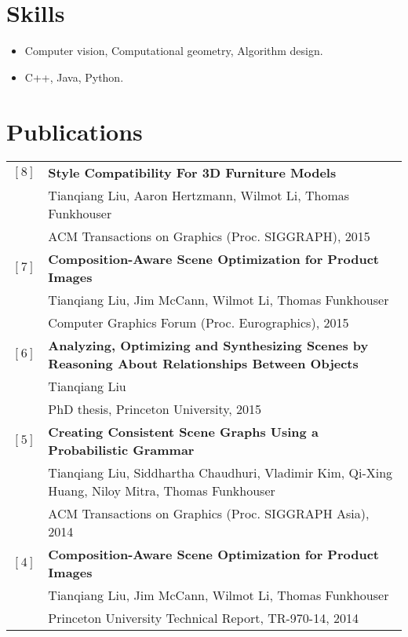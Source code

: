 \documentclass[letterpaper,10pt]{article}
\begin{document}
\section{Skills}
\begin{itemize}
    \item Computer vision, Computational geometry, Algorithm design.
    \item C++, Java, Python.
\end{itemize}

\section{Publications}
\begin{tabular}{ll}
$[8]$ & \textbf{Style Compatibility For 3D Furniture Models}\\
    & Tianqiang Liu, Aaron Hertzmann, Wilmot Li, Thomas Funkhouser \\
    & ACM Transactions on Graphics (Proc. SIGGRAPH), 2015 \vspace{0.06in}\\
$[7]$ & \textbf{Composition-Aware Scene Optimization for Product Images}\\
    & Tianqiang Liu, Jim McCann, Wilmot Li, Thomas Funkhouser \\
    & Computer Graphics Forum (Proc. Eurographics), 2015 \vspace{0.06in}\\
$[6]$ & \textbf{Analyzing, Optimizing and Synthesizing Scenes by Reasoning About Relationships Between Objects}\\
    & Tianqiang Liu \\
    & PhD thesis, Princeton University, 2015 \vspace{0.06in}\\
$[5]$ & \textbf{Creating Consistent Scene Graphs Using a Probabilistic Grammar}\\
    & Tianqiang Liu, Siddhartha Chaudhuri, Vladimir Kim, Qi-Xing Huang, Niloy Mitra, Thomas Funkhouser\\
    & ACM Transactions on Graphics (Proc. SIGGRAPH Asia), 2014 \vspace{0.06in}\\
$[4]$ & \textbf{Composition-Aware Scene Optimization for Product Images}\\
    & Tianqiang Liu, Jim McCann, Wilmot Li, Thomas Funkhouser \\
    & Princeton University Technical Report, TR-970-14, 2014 \vspace{0.06in}\\

\end{tabular}
\end{document}
